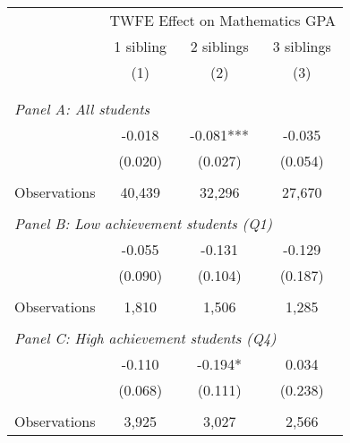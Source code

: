 \makeatletter
{}
{
\makeatother
\begin{tabular}{lccc}
\toprule
\cmidrule(lr){2-4}
& \multicolumn{3}{c}{TWFE Effect on Mathematics GPA} \\
\cmidrule(lr){2-4}
& 1 sibling & 2 siblings & 3 siblings  \\
\cmidrule(lr){2-2} \cmidrule(lr){3-3} \cmidrule(lr){4-4}
& (1) & (2) & (3)\\
\bottomrule
&  &  &  \\
&  &  &   \\
\multicolumn{4}{l}{\textit{Panel A: All students}} \\
\hspace{3mm}        &      -0.018   &      -0.081***&      -0.035   \\
                    &     (0.020)   &     (0.027)   &     (0.054)   \\
                    &               &               &               \\
\hspace{3mm}Observations&      40,439   &      32,296   &      27,670   \\
 
&  &  &   \\
\multicolumn{4}{l}{\textit{Panel B: Low achievement students (Q1)}} \\
\hspace{3mm}        &      -0.055   &      -0.131   &      -0.129   \\
                    &     (0.090)   &     (0.104)   &     (0.187)   \\
                    &               &               &               \\
\hspace{3mm}Observations&       1,810   &       1,506   &       1,285   \\
 
&  &  &   \\
\multicolumn{4}{l}{\textit{Panel C: High achievement students (Q4)}} \\
\hspace{3mm}        &      -0.110   &      -0.194*  &       0.034   \\
                    &     (0.068)   &     (0.111)   &     (0.238)   \\
                    &               &               &               \\
\hspace{3mm}Observations&       3,925   &       3,027   &       2,566   \\
 

\end{tabular}}
